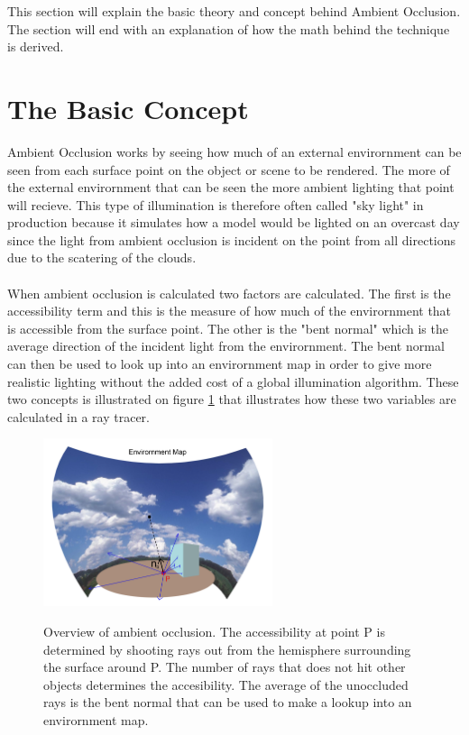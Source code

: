 This section will explain the basic theory and concept behind Ambient Occlusion. The section will end with an explanation of how the math behind the technique is derived.

\section{The Basic Concept}
Ambient Occlusion works by seeing how much of an external envirornment can be seen from each surface point on the object or scene to be rendered. The more of the external envirornment that can be seen the more ambient lighting that point will recieve. This type of illumination is therefore often called "sky light" in production because it simulates how a model would be lighted on an overcast day since the light from ambient occlusion is incident on the point from all directions due to the scatering of the clouds.
\\ \\
When ambient occlusion is calculated two factors are calculated. The first is the accessibility term and this is the measure of how much of the envirornment that is accessible from the surface point. The other is the "bent normal" which is the average direction of the incident light from the envirornment. The bent normal can then be used to look up into an envirornment map in order to give more realistic lighting without the added cost of a global illumination algorithm. These two concepts is illustrated on figure \ref{fig:overview} that illustrates how these two variables are calculated in a ray tracer.
\begin{figure}[h]
	\centering
	\includegraphics[width=0.6\textwidth]{Theory/overview}
	\label{fig:overview}
	\caption{Overview of ambient occlusion. The accessibility at point P is determined by shooting rays out from the hemisphere surrounding the surface around P. The number of rays that does not hit other objects determines the accesibility. The average of the unoccluded rays is the bent normal that can be used to make a lookup into an envirornment map.}
\end{figure}
